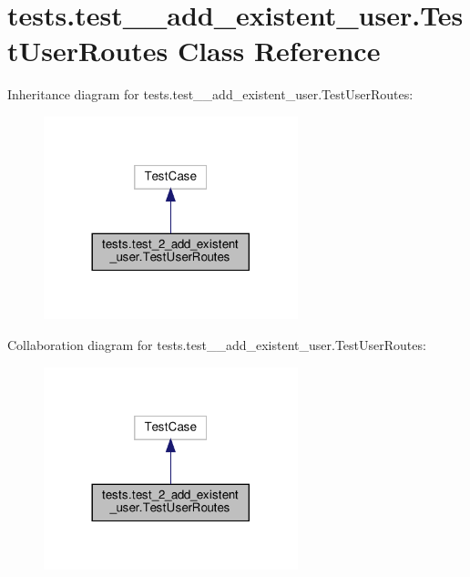 \hypertarget{classtests_1_1test__2__add__existent__user_1_1_test_user_routes}{}\section{tests.\+test\+\_\+\_\+add\+\_\+existent\+\_\+user.\+Test\+User\+Routes Class Reference}
\label{classtests_1_1test__2__add__existent__user_1_1_test_user_routes}


Inheritance diagram for tests.\+test\+\_\+\_\+add\+\_\+existent\+\_\+user.\+Test\+User\+Routes\+:
\nopagebreak
\begin{figure}[H]
\begin{center}
\leavevmode
\includegraphics[width=209pt]{classtests_1_1test__2__add__existent__user_1_1_test_user_routes__inherit__graph}
\end{center}
\end{figure}


Collaboration diagram for tests.\+test\+\_\+\_\+add\+\_\+existent\+\_\+user.\+Test\+User\+Routes\+:
\nopagebreak
\begin{figure}[H]
\begin{center}
\leavevmode
\includegraphics[width=209pt]{classtests_1_1test__2__add__existent__user_1_1_test_user_routes__coll__graph}
\end{center}
\end{figure}
